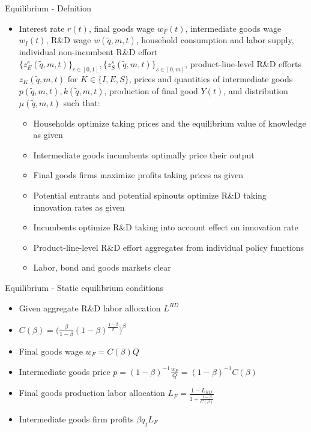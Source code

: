 \documentclass[english,usenames,dvipsnames]{beamer}
\begin{document}

\begin{frame}{Equilibrium - Defnition}
\begin{itemize}
	\footnotesize 
	\item Interest rate $r(t)$, final goods wage $w_F(t)$, intermediate goods wage $w_I(t)$, R\&D wage $w(\tilde{q},m,t)$, household consumption and labor supply, individual non-incumbent R\&D effort $\{z_E^e(\tilde{q},m,t)\}_{e \in [0,1]},\{z_S^s(\tilde{q},m,t)\}_{s \in [0,m]}$, product-line-level R\&D efforts $z_K(\tilde{q},m,t)$ for $K \in \{I,E,S\}$, prices and quantities of intermediate goods $p(\tilde{q},m,t),k(\tilde{q},m,t)$, production of final good $Y(t)$, and distribution $\mu(\tilde{q},m,t)$ such that:
	\begin{itemize}
		\footnotesize
		\item Households optimize taking prices and the equilibrium value of knowledge as given
		\item Intermediate goods incumbents optimally price their output
		\item Final goods firms maximize profits taking prices as given
		\item Potential entrants and potential spinouts optimize R\&D taking innovation rates as given
		\item Incumbents optimize R\&D taking into account effect on innovation rate
		\item Product-line-level R\&D effort aggregates from individual policy functions
		\item Labor, bond and goods markets clear 
	\end{itemize}
\end{itemize}
\end{frame}


\begin{frame}{Equilibrium - Static equilibrium conditions}
\begin{itemize}
	\item Given aggregate R\&D labor allocation $L^{RD}$
	\item $C(\beta) = \Big(\frac{\beta}{1-\beta} (1-\beta)^{\frac{1-\beta}{\beta}} \Big)^{\beta}$ 
	\item Final goods wage $w_F = C(\beta) Q$
	\item Intermediate goods price $p = (1-\beta)^{-1} \frac{w_F}{Q} = (1-\beta)^{-1} C(\beta)$
	\item Final goods production labor allocation $L_F = \frac{1 - L_{RD}}{1 + \frac{1-\beta}{C(\beta)}}$
	\item Intermediate goods firm profits $\beta q_j L_F$
\end{itemize}
\end{frame}
\end{document}
